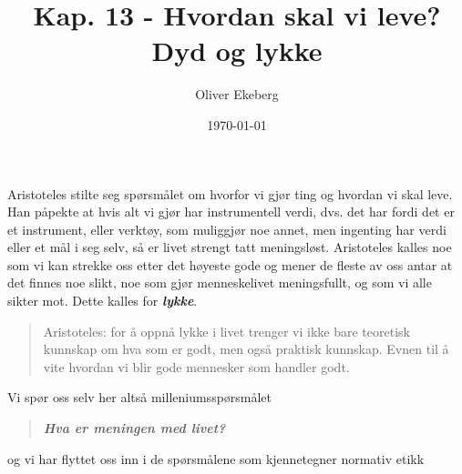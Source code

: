 \documentclass[11pt, a4paper]{article}
\title{Kap. 13 - Hvordan skal vi leve? Dyd og lykke}
\author{Oliver Ekeberg}
\date{\today}
\begin{document}
\maketitle

\tableofcontents

\begin{flushleft}
    Aristoteles stilte seg spørsmålet om hvorfor vi gjør ting og hvordan vi skal leve. Han påpekte at hvis alt vi gjør har instrumentell verdi, dvs. det har fordi det er et instrument, eller verktøy, som muliggjør noe annet, men ingenting har verdi eller et mål i seg selv, så er livet strengt tatt meningsløst. Aristoteles kalles noe som vi kan strekke oss etter det høyeste gode og mener de fleste av oss antar at det finnes noe slikt, noe som gjør menneskelivet meningsfullt, og som vi alle sikter mot. Dette kalles for \textbf{\textit{lykke}}.
\end{flushleft}

\begin{quote}
    Aristoteles: for å oppnå lykke i livet trenger vi ikke bare teoretisk kunnskap om hva som er godt, men også praktisk kunnskap. Evnen til å vite hvordan vi blir gode mennesker som handler godt. 
\end{quote}


\begin{flushleft}
    Vi spør oss selv her altså milleniumsspørsmålet
\end{flushleft}
\begin{quote}
    \textbf{\textit{Hva er meningen med livet?}}
\end{quote}
og vi har flyttet oss inn i de spørsmålene som kjennetegner normativ etikk
\end{document}
